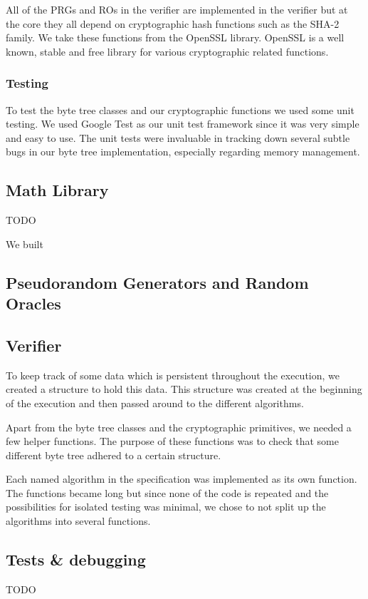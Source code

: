 All of the PRGs and ROs in the verifier are implemented in the verifier but at the core they all depend on cryptographic hash functions such as the SHA-2 family. We take these functions from the OpenSSL library. OpenSSL is a well known, stable and free library for various cryptographic related functions.

\subsubsection{Testing}

To test the byte tree classes and our cryptographic functions we used some unit testing. We used Google Test as our unit test framework since it was very simple and easy to use. The unit tests were invaluable in tracking down several subtle bugs in our byte tree implementation, especially regarding memory management.

\subsection{Math Library}

TODO

We built 

\subsection{Pseudorandom Generators and Random Oracles}


\subsection{Verifier}

To keep track of some data which is persistent throughout the execution, we created a structure to hold this data. This structure was created at the beginning of the execution and then passed around to the different algorithms.

Apart from the byte tree classes and the cryptographic primitives, we needed a few helper functions. The purpose of these functions was to check that some different byte tree adhered to a certain structure.

Each named algorithm in the specification was implemented as its own function. The functions became long but since none of the code is repeated and the possibilities for isolated testing was minimal, we chose to not split up the algorithms into several functions.

\subsection{Tests \& debugging}

TODO